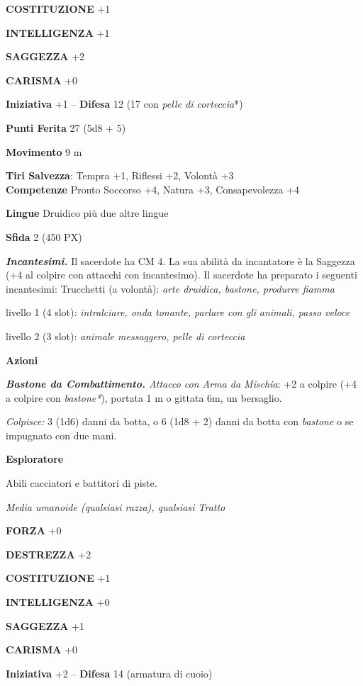 \begin{multicols}{2}
\textbf{COSTITUZIONE} +1

\textbf{INTELLIGENZA} +1

\textbf{SAGGEZZA} +2

\textbf{CARISMA} +0

\textbf{Iniziativa} +1 -- \textbf{Difesa} 12 (17 con \textit{pelle di corteccia}*)

\textbf{Punti Ferita} 27 (5d8 + 5)

\textbf{Movimento} 9 m

\textbf{Tiri Salvezza}: Tempra +1, Riflessi +2, Volontà +3 \\

\textbf{Competenze} Pronto Soccorso +4, Natura +3, Consapevolezza +4

\textbf{Lingue} Druidico più due altre lingue

\textbf{Sfida} 2 (450 PX)

\textit{\textbf{Incantesimi.}} Il sacerdote ha CM 4. La sua abilità da incantatore è la Saggezza (+4 al colpire con attacchi con incantesimo). Il sacerdote ha preparato i seguenti incantesimi: Trucchetti (a volontà): \textit{arte druidica, bastone, produrre fiamma}

livello 1 (4 slot): \textit{intralciare, onda tonante, parlare con gli}
\textit{animali, passo veloce}

livello 2 (3 slot): \textit{animale messaggero, pelle di corteccia}

\textbf{Azioni}

\textit{\textbf{Bastone da Combattimento.} Attacco con Arma da Mischia}: +2 a colpire (+4 a colpire con \textit{bastone*}), portata 1 m o gittata 6m, un bersaglio.

\textit{Colpisce:} 3 (1d6) danni da botta, o 6 (1d8 + 2) danni da botta con \textit{bastone} o se impugnato con due mani.

\medskip\textbf{Esploratore}

Abili cacciatori e battitori di piste.

\textit{Media umanoide (qualsiasi razza), qualsiasi Tratto}

\textbf{FORZA} +0

\textbf{DESTREZZA} +2

\textbf{COSTITUZIONE} +1

\textbf{INTELLIGENZA} +0

\textbf{SAGGEZZA} +1

\textbf{CARISMA} +0

\textbf{Iniziativa} +2 -- \textbf{Difesa} 14 (armatura di cuoio)


\end{multicols}
